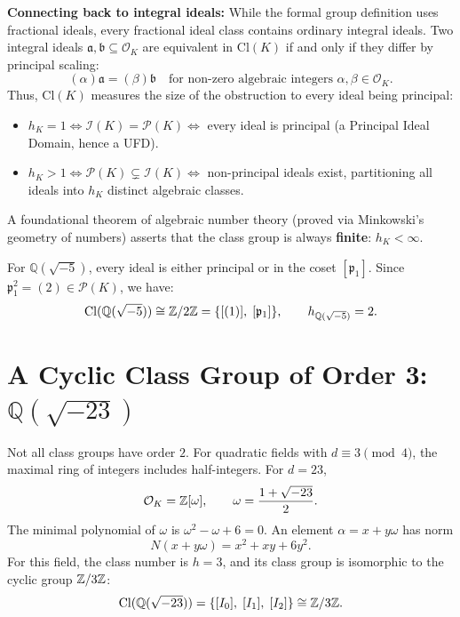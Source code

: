 \documentclass[a4paper]{article}
\begin{document}
\noindent\textbf{Connecting back to integral ideals:}
While the formal group definition uses fractional ideals, every fractional ideal class contains ordinary integral ideals. Two integral ideals $\mathfrak{a}, \mathfrak{b} \subseteq \mathcal{O}_K$ are equivalent in $\mathrm{Cl}(K)$ if and only if they differ by principal scaling:
\begin{equation}
 (\alpha) \mathfrak{a} = (\beta) \mathfrak{b} \quad \text{for non-zero algebraic integers } \alpha, \beta \in \mathcal{O}_K.
\end{equation}
Thus, $\mathrm{Cl}(K)$ measures the size of the obstruction to every ideal being principal:
\begin{itemize}[leftmargin=2em]
 \item $h_K = 1 \iff \mathcal{I}(K) = \mathcal{P}(K) \iff$ every ideal is principal (a Principal Ideal Domain, hence a UFD).
 \item $h_K > 1 \iff \mathcal{P}(K) \subsetneq \mathcal{I}(K) \iff$ non-principal ideals exist, partitioning all ideals into $h_K$ distinct algebraic classes.
\end{itemize}

A foundational theorem of algebraic number theory (proved via Minkowski's geometry of numbers) asserts that the class group is always \textbf{finite}: $h_K < \infty$.

For $\mathbb{Q}(\sqrt{-5})$, every ideal is either principal or in the coset $[\mathfrak{p}_1]$. Since $\mathfrak{p}_1^2 = (2) \in \mathcal{P}(K)$, we have:
\begin{equation}
 \mathrm{Cl}(\mathbb{Q}(\sqrt{-5})) \cong \mathbb{Z}/2\mathbb{Z} = \{ [(1)], \; [\mathfrak{p}_1] \}, \qquad h_{\mathbb{Q}(\sqrt{-5})} = 2.
\end{equation}

\section{A Cyclic Class Group of Order 3: \texorpdfstring{$\mathbb{Q}(\sqrt{-23})$}{Q(sqrt(-23))}}
\label{sec:q_sqrt_23}
Not all class groups have order $2$. For quadratic fields with $d \equiv 3 \pmod 4$, the maximal ring of integers includes half-integers. For $d = 23$,
\begin{equation}
 \mathcal{O}_K = \mathbb{Z}[\omega], \qquad \omega = \frac{1 + \sqrt{-23}}{2}.
\end{equation}
The minimal polynomial of $\omega$ is $\omega^2 - \omega + 6 = 0$. An element $\alpha = x + y\omega$ has norm
\begin{equation}
 N(x + y\omega) = x^2 + xy + 6y^2.
\end{equation}
For this field, the class number is $h = 3$, and its class group is isomorphic to the cyclic group $\mathbb{Z}/3\mathbb{Z}$:
\begin{equation}
 \mathrm{Cl}(\mathbb{Q}(\sqrt{-23})) = \{ [I_0], \; [I_1], \; [I_2] \} \cong \mathbb{Z}/3\mathbb{Z}.
\end{equation}
\end{document}
